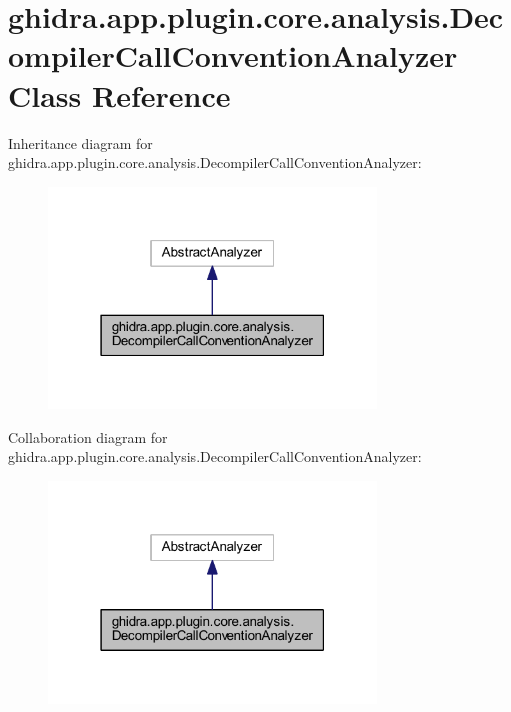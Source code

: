 \hypertarget{classghidra_1_1app_1_1plugin_1_1core_1_1analysis_1_1_decompiler_call_convention_analyzer}{}\section{ghidra.\+app.\+plugin.\+core.\+analysis.\+Decompiler\+Call\+Convention\+Analyzer Class Reference}
\label{classghidra_1_1app_1_1plugin_1_1core_1_1analysis_1_1_decompiler_call_convention_analyzer}


Inheritance diagram for ghidra.\+app.\+plugin.\+core.\+analysis.\+Decompiler\+Call\+Convention\+Analyzer\+:
\nopagebreak
\begin{figure}[H]
\begin{center}
\leavevmode
\includegraphics[width=247pt]{classghidra_1_1app_1_1plugin_1_1core_1_1analysis_1_1_decompiler_call_convention_analyzer__inherit__graph}
\end{center}
\end{figure}


Collaboration diagram for ghidra.\+app.\+plugin.\+core.\+analysis.\+Decompiler\+Call\+Convention\+Analyzer\+:
\nopagebreak
\begin{figure}[H]
\begin{center}
\leavevmode
\includegraphics[width=247pt]{classghidra_1_1app_1_1plugin_1_1core_1_1analysis_1_1_decompiler_call_convention_analyzer__coll__graph}
\end{center}
\end{figure}

